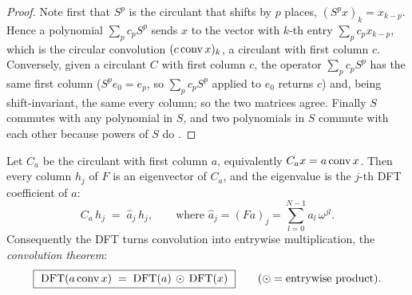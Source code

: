 \begin{proof}
Note first that $S^p$ is the circulant that shifts by $p$ places, $(S^p x)_k = x_{k-p}$.
Hence a polynomial $\sum_p c_p S^p$ sends $x$ to the vector with $k$-th entry $\sum_p
c_p x_{k-p}$, which is the circular convolution $(c \operatorname{conv} x)_k$, a circulant with
first column $c$. Conversely, given a circulant $C$ with first column $c$, the operator
$\sum_p c_p S^p$ has the same first column ($S^p e_0 = e_p$, so $\sum_p c_p S^p$ applied
to $e_0$ returns $c$) and, being shift-invariant, the same every column; so the two
matrices agree. Finally $S$ commutes with any polynomial in $S$, and two polynomials in
$S$ commute with each other because powers of $S$ do
\citep{fourier_rutgers}.
\end{proof}

\begin{theorem}
\label{thm:circdiag}
Let $C_a$ be the circulant with first column $a$, equivalently $C_a x = a \operatorname{conv} x$.
Then every column $h_j$ of $F$ is an eigenvector of $C_a$, and the eigenvalue is the
$j$-th DFT coefficient of $a$:
\[
  C_a\, h_j \;=\; \widehat{a}_j\, h_j,
  \qquad\text{where } \widehat{a}_j = (Fa)_j = \sum_{l=0}^{N-1} a_l\, \omega^{jl}.
\]
Consequently the DFT turns convolution into entrywise multiplication, the
\emph{convolution theorem}:
\[
  \boxed{\ \mathrm{DFT}(a \conv x) \;=\; \mathrm{DFT}(a)\,\odot\,\mathrm{DFT}(x)\ }
  \qquad (\odot = \text{entrywise product}).
\]
\end{theorem}

